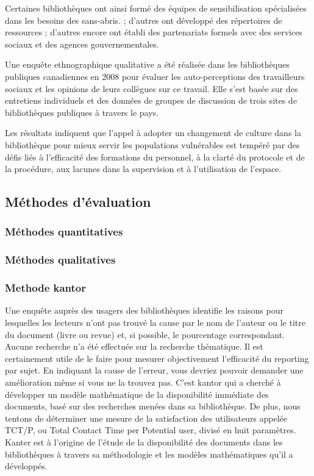 \documentclass[french,a4paper,12pt]{article}
\begin{document}
Certaines bibliothèques ont ainsi formé des équipes de sensibilisation spécialisées dans les besoins des sans-abris. ; d'autres ont développé des répertoires de ressources ; d'autres encore ont établi des partenariats formels avec des services sociaux et des agences gouvernementales. 
 
Une enquête ethnographique qualitative a été réalisée dans les bibliothèques publiques canadiennes en 2008 pour évaluer les auto-perceptions des travailleurs sociaux et les opinions de leurs collègues sur ce travail. Elle s’est basée sur des entretiens individuels et des données de groupes de discussion de trois sites de bibliothèques publiques à travers le pays. 

Les résultats indiquent que l'appel à adopter un changement de culture dans la bibliothèque pour mieux servir les populations vulnérables est tempéré par des défis liés à l'efficacité des formations du personnel, à la clarté du protocole et de la procédure, aux lacunes dans la supervision et à l'utilisation de l'espace. 

 

 







\subsection{Méthodes d'évaluation}

\subsubsection{Méthodes quantitatives}


\subsubsection{Méthodes qualitatives}

\subsubsection{Methode kantor }

\quad Une enquête auprès des usagers des bibliothèques identifie les raisons pour lesquelles les lecteurs n'ont pas trouvé la cause par le nom de l'auteur ou le titre du document (livre ou revue) et, si possible, le pourcentage correspondant. Aucune recherche n'a été effectuée sur la recherche thématique.
Il est certainement utile de le faire pour mesurer objectivement l'efficacité du reporting par sujet. En indiquant la cause de l'erreur, vous devriez pouvoir demander une amélioration même si vous ne la trouvez pas. 
\quad C'est kantor qui a cherché à développer un modèle mathématique de la disponibilité immédiate des documents, basé sur des recherches menées dans sa bibliothèque. De plus, nous tentons de déterminer une mesure de la satisfaction des utilisateurs appelée TCT/P, ou Total Contact Time per Potential user, divisé en huit paramètres. Kanter est à l'origine de l'étude de la disponibilité des documents dans les bibliothèques à travers sa méthodologie et les modèles mathématiques qu'il a développés.
\end{document}
